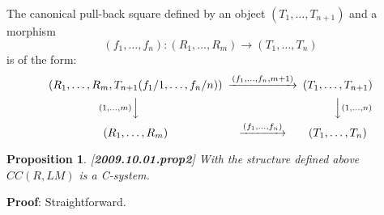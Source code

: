 \documentclass[11pt]{article}
\newenvironment{eq}{\begin{equation}}{\end{equation}}
\newenvironment{proof}{{\bf Proof}:}{\vskip 5mm }
\newtheorem{proposition}{Proposition}[subsection]
\newcommand{\llabel}[1]{\label{#1}[{\bf #1}]}
\newcommand{\sr}{\rightarrow}
\begin{document}
The canonical pull-back square defined by an object $(T_1,\dots,T_{n+1})$ and a morphism 
%
$$(f_1,\dots,f_{n}):(R_1,\dots,R_m)\sr (T_1,\dots,T_{n})$$
%
is of the form:
%
\begin{eq}
\label{2009.11.05.oldeq1}
\begin{CD}
(R_1,\dots,R_m,T_{n+1}(f_1/1,\dots, f_{n}/n)) @>(f_1,\dots,f_{n},m+1)>> (T_1,\dots,T_{n+1})\\
@V(1,\dots,m)VV @VV(1,\dots,n)V\\
(R_1,\dots,R_m) @>(f_1,\dots,f_{n})>> (T_1,\dots,T_{n})
\end{CD}
\end{eq}
%
%
\begin{proposition}
\llabel{2009.10.01.prop2}
With the structure defined above $CC(R,LM)$ is a C-system.
\end{proposition}
%
\begin{proof}
Straightforward.
\end{proof}
%
%
\end{document}
